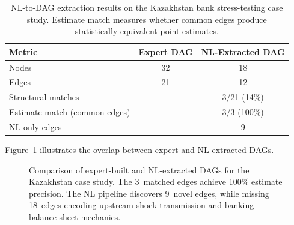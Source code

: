 \documentclass{article}
\begin{document}
\begin{table}[t]
\centering
\caption{NL-to-DAG extraction results on the Kazakhstan bank stress-testing case study. Estimate match measures whether common edges produce statistically equivalent point estimates.}
\label{tab:nl2dag}
\small
\begin{tabular}{@{}lcc@{}}
\toprule
\textbf{Metric} & \textbf{Expert DAG} & \textbf{NL-Extracted DAG} \\
\midrule
Nodes & 32 & 18 \\
Edges & 21 & 12 \\
Structural matches & --- & 3/21 (14\%) \\
Estimate match (common edges) & --- & 3/3 (100\%) \\
NL-only edges & --- & 9 \\
\bottomrule
\end{tabular}
\end{table}

Figure~\ref{fig:nl2dag} illustrates the overlap between expert and NL-extracted DAGs.

\begin{figure}[t]
    \centering
    \caption{Comparison of expert-built and NL-extracted DAGs for the Kazakhstan case study. The 3~matched edges achieve 100\% estimate precision. The NL pipeline discovers 9~novel edges, while missing 18~edges encoding upstream shock transmission and banking balance sheet mechanics.}
    \label{fig:nl2dag}
\end{figure}
\end{document}
